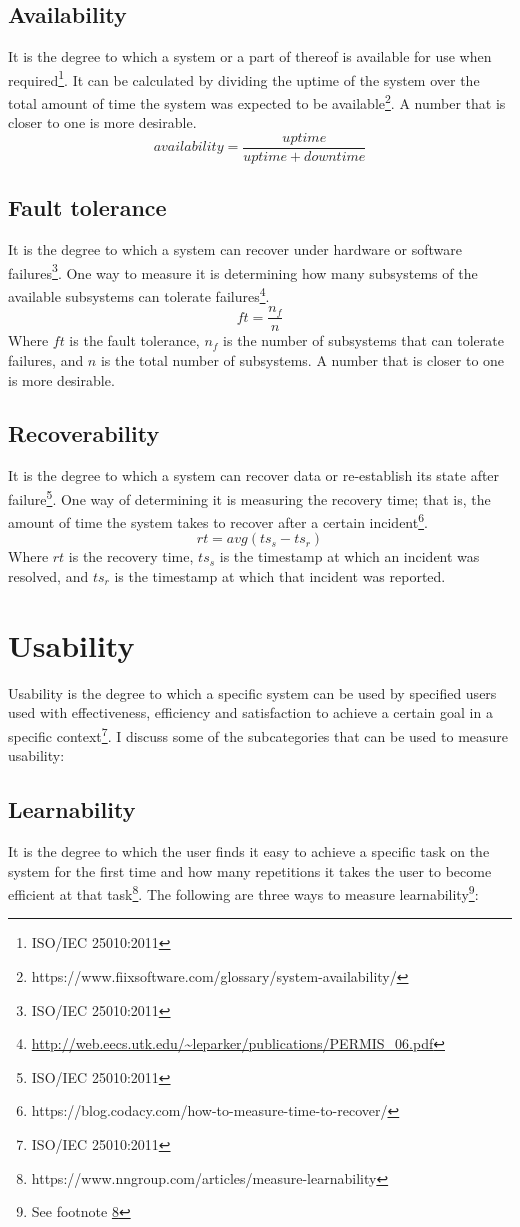 \documentclass[11pt,a4paper]{article}
\def \iso{\footnote{ISO/IEC 25010:2011}}
\begin{document}
\subsection{Availability}
It is the degree to which a system or a part of thereof is available for use when required\iso. It can be calculated by
dividing the uptime of the system over the total amount of time the system was expected to be
available\footnote{https://www.fiixsoftware.com/glossary/system-availability/}. A number that is closer to one is more
desirable.
\[availability = \frac{uptime}{uptime + downtime}\]

\subsection{Fault tolerance}
It is the degree to which a system can recover under hardware or software failures\iso.
One way to measure it is determining how many subsystems of the available subsystems
can tolerate failures\footnote{\url{http://web.eecs.utk.edu/~leparker/publications/PERMIS_06.pdf}}.
\[ft = \frac{n_f}{n}\]
Where $ft$ is the fault tolerance, $n_f$ is the number of subsystems that can tolerate failures,
and $n$ is the total number of subsystems. A number that is closer to one is more desirable.

\subsection{Recoverability}
It is the degree to which a system can recover data or re-establish its state after failure\iso.
One way of determining it is measuring the recovery time;
that is, the amount of time the system takes to recover after a certain
incident\footnote{https://blog.codacy.com/how-to-measure-time-to-recover/}.
\[rt = avg(ts_s - ts_r)\]
Where $rt$ is the recovery time, $ts_s$ is the timestamp at which an incident was resolved,
and $ts_r$ is the timestamp at which that incident was reported.

\section{Usability}
Usability is the degree to which a specific system can be used by specified users used with
effectiveness, efficiency and satisfaction to achieve a certain goal in a specific context\iso.
I discuss some of the subcategories that can be used to measure usability:

\subsection{Learnability}
It is the degree to which the user finds it easy to achieve a specific task on the system for the first time and
how many repetitions it takes the user to become efficient at that
task\footnote{\label{measure_learnability}https://www.nngroup.com/articles/measure-learnability}.
The following are three ways to measure
learnability\footnote{See footnote \ref{measure_learnability}}:
\end{document}
